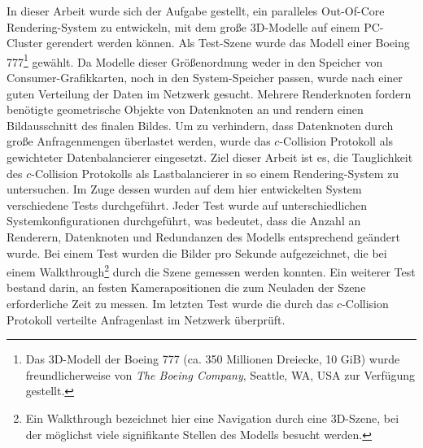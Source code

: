 In dieser Arbeit wurde sich der Aufgabe gestellt, ein paralleles Out-Of-Core Rendering-System zu entwickeln, mit dem große 3D-Modelle auf einem PC-Cluster gerendert werden können. Als Test-Szene wurde das Modell einer Boeing 777\footnote{Das 3D-Modell der Boeing 777 (ca. 350 Millionen Dreiecke, 10 GiB) wurde freundlicherweise von \textit{The Boeing Company}, Seattle, WA, USA zur Verfügung gestellt.} gewählt. Da Modelle dieser Größenordnung weder in den Speicher von Consumer-Grafikkarten, noch in den System-Speicher passen, wurde nach einer guten Verteilung der Daten im Netzwerk gesucht. Mehrere Renderknoten fordern benötigte geometrische Objekte von Datenknoten an und rendern einen Bildausschnitt des finalen Bildes. Um zu verhindern, dass Datenknoten durch große Anfragenmengen überlastet werden, wurde das $c$-Collision Protokoll als gewichteter Datenbalancierer eingesetzt. Ziel dieser Arbeit ist es, die Tauglichkeit des $c$-Collision Protokolls als Lastbalancierer in so einem Rendering-System zu untersuchen. Im Zuge dessen wurden auf dem hier entwickelten System verschiedene Tests durchgeführt. Jeder Test wurde auf unterschiedlichen Systemkonfigurationen durchgeführt, was bedeutet, dass die Anzahl an Renderern, Datenknoten und Redundanzen des Modells entsprechend geändert wurde. Bei einem Test wurden die Bilder pro Sekunde aufgezeichnet, die bei einem Walkthrough\footnote{Ein Walkthrough bezeichnet hier eine Navigation durch eine 3D-Szene, bei der möglichst viele signifikante Stellen des Modells besucht werden.} durch die Szene gemessen werden konnten. Ein weiterer Test bestand darin, an festen Kamerapositionen die zum Neuladen der Szene erforderliche Zeit zu messen. Im letzten Test wurde die durch das $c$-Collision Protokoll verteilte Anfragenlast im Netzwerk überprüft.


%
%
